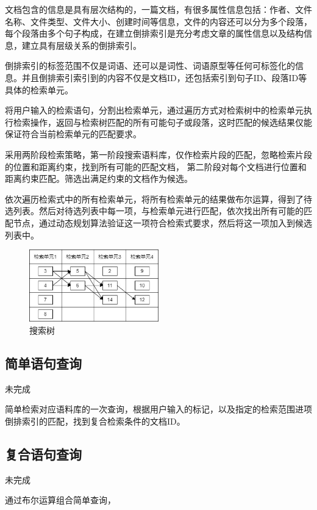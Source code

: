 \documentclass[11pt]{article}
\begin{document}
\begin{CJK*}{UTF8}{gbsn}
文档包含的信息是具有层次结构的，一篇文档，有很多属性信息包括：作者、文件名称、文件类型、文件大小、创建时间等信息，文件的内容还可以分为多个段落，每个段落由多个句子构成，在建立倒排索引是充分考虑文章的属性信息以及结构信息，建立具有层级关系的倒排索引。

倒排索引的标签范围不仅是词语、还可以是词性、词语原型等任何可标签化的信息。并且倒排索引索引到的内容不仅是文档ID，还包括索引到句子ID、段落ID等具体的检索单元。


将用户输入的检索语句，分割出检索单元，通过遍历方式对检索树中的检索单元执行检索操作，返回与检索树匹配的所有可能句子或段落，这时匹配的候选结果仅能保证符合当前检索单元的匹配要求。

采用两阶段检索策略，第一阶段搜索语料库，仅作检索片段的匹配，忽略检索片段的位置和距离约束，找到所有可能的匹配文档， 第二阶段对每个文档进行位置和距离约束匹配。筛选出满足约束的文档作为候选。

依次遍历检索式中的所有检索单元，将所有检索单元的结果做布尔运算，得到了待选列表。然后对待选列表中每一项，与检索单元进行匹配，依次找出所有可能的匹配节点，通过动态规划算法验证这一项符合检索式要求，然后将这一项加入到候选列表中。

\begin{figure}[h]
	\centering
	\includegraphics[width=0.5\textwidth]{dy.jpg}
	\caption{搜索树}
	\label{fig:example}
\end{figure}

\subsection{简单语句查询}

未完成

简单检索对应语料库的一次查询，根据用户输入的标记，以及指定的检索范围进项倒排索引的匹配，找到复合检索条件的文档ID。

\subsection{复合语句查询}


未完成

通过布尔运算组合简单查询，


\end{CJK*}
\end{document}

